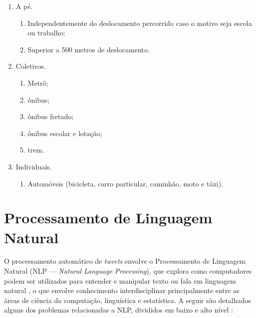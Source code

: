 \documentclass[
	12pt,				%
	oneside,			%
	a4paper,			%
	english,			%
	brazil				%
	]{abntex2ppgsi}
\begin{document}
\begin{enumerate}
\item A pé.
\begin{enumerate}
\item Independentemente do deslocamento percorrido caso o motivo seja escola ou trabalho;
\item  Superior a 500 metros de deslocamento.
\end{enumerate}
\item Coletivos.
\begin{enumerate}
\item Metrô;
\item ônibus;
\item ônibus fretado;
\item ônibus escolar e lotação;
\item trem.
\end{enumerate}
\item Individuais.
\begin{enumerate}
\item Automóveis (bicicleta, carro particular, caminhão, moto e táxi).
\end{enumerate}
\end{enumerate}


\section{Processamento de Linguagem Natural}
\label{nlp}

O processamento automático de \textit{tweets} envolve o Processamento de Linguagem Natural (NLP --- \textit{Natural Language Processing}), que explora como computadores podem ser utilizados para entender e manipular texto ou fala em linguagem natural \cite{liu2017roadmap}, o que envolve conhecimento interdisciplinar principalmente entre as áreas de ciência da computação, linguística e estatística. A seguir são detalhados alguns dos problemas relacionadas a NLP, divididos em baixo e alto nível \cite{nadkarni2011natural}:
\end{document}

